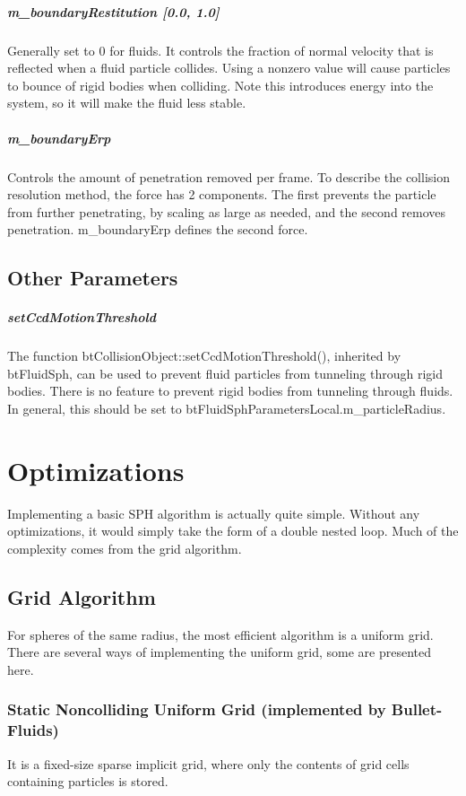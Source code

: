 \documentclass[]{article}
\begin{document}
		\subparagraph{m\_boundaryRestitution [0.0, 1.0]}
			Generally set to 0 for fluids. It controls the fraction of normal velocity that is reflected when a fluid 
			particle collides. Using a nonzero value will cause particles to bounce of rigid bodies when colliding. 
			Note this introduces energy into the system, so it will make the fluid less stable.
			
		\subparagraph{m\_boundaryErp}
			Controls the amount of penetration removed per frame. To describe the collision resolution method,
			the force has 2 components. The first prevents the particle from further penetrating, by scaling as
			large as needed, and the second removes penetration. m\_boundaryErp defines the second force.
		
	\subsection{Other Parameters}
		\subparagraph{setCcdMotionThreshold}
			The function btCollisionObject::setCcdMotionThreshold(), inherited by btFluidSph,
			can be used to prevent fluid particles from tunneling through rigid bodies.
			There is no feature to prevent rigid bodies from tunneling through fluids.
			In general, this should be set to btFluidSphParametersLocal.m\_particleRadius.
			
\pagebreak		
\section{Optimizations}
	Implementing a basic SPH algorithm is actually quite simple. Without any optimizations, 
	it would simply take the form of a double nested loop. Much of the complexity comes from the grid algorithm.
		
	\subsection{Grid Algorithm}
		For spheres of the same radius, the most efficient algorithm is a uniform grid.
		There are several ways of implementing the uniform grid, some are presented here.\\
		
		\subsubsection{Static Noncolliding Uniform Grid (implemented by Bullet-Fluids) }
			It is a fixed-size sparse implicit grid, where only the contents of grid cells containing particles is stored.
			
\end{document}
